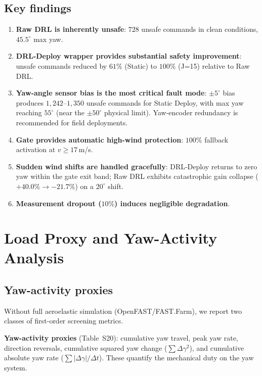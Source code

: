 \documentclass{article}
\begin{document}
\subsection{Key findings}

\begin{enumerate}
\item \textbf{Raw DRL is inherently unsafe}: $728$ unsafe commands in clean conditions, $45.5^\circ$ max yaw.
\item \textbf{DRL-Deploy wrapper provides substantial safety improvement}: unsafe commands reduced by $61\%$ (Static) to $100\%$ (J=15) relative to Raw DRL.
\item \textbf{Yaw-angle sensor bias is the most critical fault mode}: $\pm5^\circ$ bias produces $1{,}242$--$1{,}350$ unsafe commands for Static Deploy, with max yaw reaching $55^\circ$ (near the $\pm50^\circ$ physical limit). Yaw-encoder redundancy is recommended for field deployments.
\item \textbf{Gate provides automatic high-wind protection}: $100\%$ fallback activation at $v{\geq}17$\,m/s.
\item \textbf{Sudden wind shifts are handled gracefully}: DRL-Deploy returns to zero yaw within the gate exit band; Raw DRL exhibits catastrophic gain collapse ($+40.0\%{\to}{-}21.7\%$) on a $20^\circ$ shift.
\item \textbf{Measurement dropout ($10\%$) induces negligible degradation}.
\end{enumerate}

\section{Load Proxy and Yaw-Activity Analysis}\label{sec:load}

\subsection{Yaw-activity proxies}

Without full aeroelastic simulation (OpenFAST/FAST.Farm), we report two classes of first-order screening metrics.

\textbf{Yaw-activity proxies} (Table~S20): cumulative yaw travel, peak yaw rate, direction reversals, cumulative squared yaw change ($\sum\Delta\gamma^2$), and cumulative absolute yaw rate ($\sum|\Delta\gamma|/\Delta t$). These quantify the mechanical duty on the yaw system.
\end{document}
